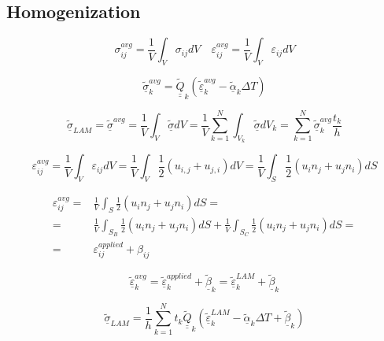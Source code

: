 \documentclass[review]{elsarticle}
\begin{document}
\subsection{Homogenization}

\begin{equation}
\sigma_{ij}^{avg}=\frac{1}{V}\int_{V}\sigma_{ij}dV\quad\varepsilon_{ij}^{avg}=\frac{1}{V}\int_{V}\varepsilon_{ij}dV
\end{equation}

\begin{equation}
\underline{\tilde{\sigma}}_{k}^{avg}=\underline{\underline{\tilde{Q}}}_{k}\left(\underline{\tilde{\varepsilon}}_{k}^{avg}-\underline{\tilde{\alpha}}_{k}\Delta T\right)
\end{equation}

\begin{equation}
\underline{\tilde{\sigma}}_{LAM}=\underline{\tilde{\sigma}}^{avg}=\frac{1}{V}\int_{V}\underline{\tilde{\sigma}}dV=\frac{1}{V}\sum_{k=1}^{N}\int_{V_{k}}\underline{\tilde{\sigma}}dV_{k}=\sum_{k=1}^{N}\underline{\tilde{\sigma}}_{k}^{avg}\frac{t_{k}}{h}
\end{equation}

\begin{equation}
\varepsilon_{ij}^{avg}=\frac{1}{V}\int_{V}\varepsilon_{ij}dV=\frac{1}{V}\int_{V}\frac{1}{2}\left(u_{i,j}+u_{j,i}\right)dV=\frac{1}{V}\int_{S}\frac{1}{2}\left(u_{i}n_{j}+u_{j}n_{i}\right)dS
\end{equation}

\begin{equation}
\begin{aligned}
\varepsilon_{ij}^{avg}=&\frac{1}{V}\int_{S}\frac{1}{2}\left(u_{i}n_{j}+u_{j}n_{i}\right)dS=\\
=&\frac{1}{V}\int_{S_{B}}\frac{1}{2}\left(u_{i}n_{j}+u_{j}n_{i}\right)dS+\frac{1}{V}\int_{S_{C}}\frac{1}{2}\left(u_{i}n_{j}+u_{j}n_{i}\right)dS=\\
=&\varepsilon_{ij}^{applied}+\beta_{ij}
\end{aligned}
\end{equation}

\begin{equation}
\underline{\tilde{\varepsilon}}_{k}^{avg}=\underline{\tilde{\varepsilon}}_{k}^{applied}+\underline{\tilde{\beta}}_{k}=\underline{\tilde{\varepsilon}}_{k}^{LAM}+\underline{\tilde{\beta}}_{k}
\end{equation}

\begin{equation}
\underline{\tilde{\sigma}}_{LAM}=\frac{1}{h}\sum_{k=1}^{N}t_{k}\underline{\underline{\tilde{Q}}}_{k}\left(\underline{\tilde{\varepsilon}}_{k}^{LAM}-\underline{\tilde{\alpha}}_{k}\Delta T+\underline{\tilde{\beta}}_{k}\right)
\end{equation}
\end{document}
